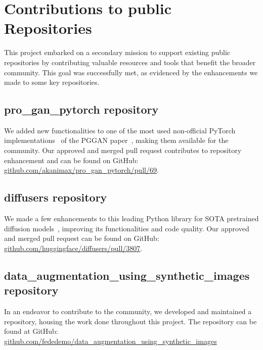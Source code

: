 \chapter{Contributions to public Repositories}

This project embarked on a secondary mission to support existing public repositories by contributing valuable resources and tools that benefit the broader community. This goal was successfully met, as evidenced by the enhancements we made to some key repositories.

\section{pro\_gan\_pytorch repository}

We added new functionalities to one of the most used non-official PyTorch implementations~\cite{proganpytorch} of the PGGAN paper~\cite{karras_pggan}, making them available for the community. Our approved and merged pull request contributes to repository enhancement and can be found on GitHub: \url{github.com/akanimax/pro_gan_pytorch/pull/69}.

\section{diffusers repository}

We made a few enhancements to this leading Python library for SOTA pretrained diffusion models~\cite{von-platen-etal-2022-diffusers}, improving its functionalities and code quality. Our approved and merged pull request can be found on GitHub: \url{github.com/huggingface/diffusers/pull/3807}.

\section{data\_augmentation\_using\_synthetic\_images repository}

In an endeavor to contribute to the community, we developed and maintained a repository, housing the work done throughout this project. The repository can be found at GitHub: \url{github.com/fededemo/data_augmentation_using_synthetic_images}